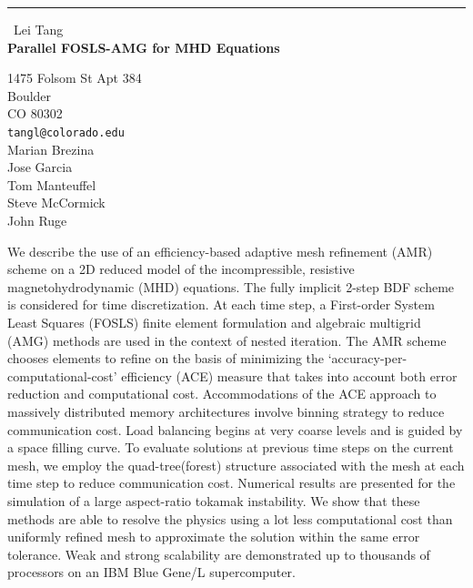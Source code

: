 \documentclass{report}
\begin{document}
\begin{center}
\rule{6in}{1pt} \
{\large Lei Tang \\
{\bf Parallel FOSLS-AMG for MHD Equations}}

1475 Folsom St Apt 384 \\ Boulder \\ CO 80302
\\
{\tt tangl@colorado.edu}\\
Marian Brezina\\
Jose Garcia\\
Tom Manteuffel\\
Steve McCormick\\
John Ruge\end{center}

We describe the use of an efficiency-based adaptive mesh refinement (AMR)
scheme on a 2D reduced model of the incompressible, resistive
magnetohydrodynamic (MHD) equations. The fully implicit 2-step BDF scheme
is considered for time discretization. At each time step, a First-order
System Least Squares (FOSLS) finite element formulation and algebraic
multigrid (AMG) methods are used in the context of nested iteration. The
AMR scheme chooses elements to refine on the basis of minimizing the
`accuracy-per-computational-cost' efficiency (ACE) measure that takes
into account both error reduction and computational cost. Accommodations
of the ACE approach to massively distributed memory architectures involve
binning strategy to reduce communication cost. Load balancing begins at
very coarse levels and is guided by a space filling curve. To evaluate
solutions at previous time steps on the current mesh, we employ the
quad-tree(forest) structure associated with the mesh at each time step to
reduce communication cost. Numerical results are presented for the
simulation of a large aspect-ratio tokamak instability. We show that
these methods are able to resolve the physics using a lot less
computational cost than uniformly refined mesh to approximate the
solution within the same error tolerance. Weak and strong scalability are
demonstrated up to thousands of processors on an IBM Blue Gene/L
supercomputer.
\end{document}
